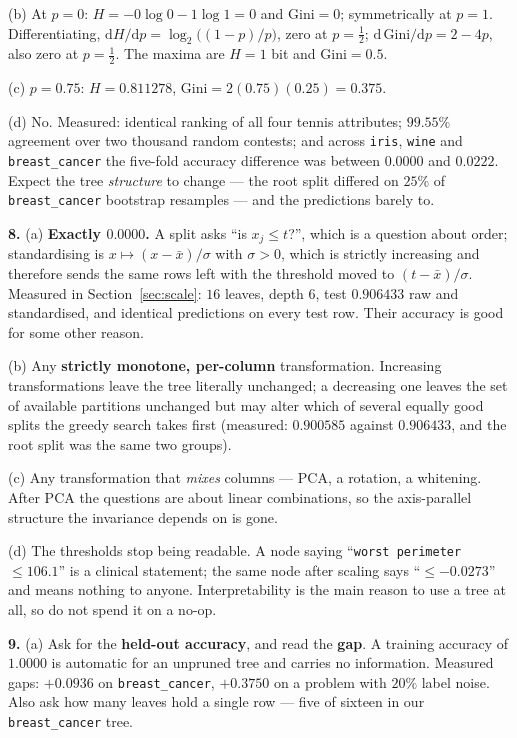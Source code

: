 \documentclass[11pt]{article}
\begin{document}
(b) At $p = 0$: $H = -0\log 0 - 1\log 1 = 0$ and $\mathrm{Gini} = 0$;
symmetrically at $p=1$. Differentiating,
$\mathrm{d}H/\mathrm{d}p = \log_2\!\big((1-p)/p\big)$, zero at $p = \tfrac12$;
$\mathrm{d}\,\mathrm{Gini}/\mathrm{d}p = 2 - 4p$, also zero at $p = \tfrac12$.
The maxima are $H = 1$ bit and $\mathrm{Gini} = 0.5$.

(c) $p = 0.75$: $H = 0.811278$, $\mathrm{Gini} = 2(0.75)(0.25) = 0.375$.

(d) No. Measured: identical ranking of all four tennis attributes; $99.55\%$
agreement over two thousand random contests; and across
\texttt{iris}, \texttt{wine} and \texttt{breast\_cancer} the five-fold
accuracy difference was between $0.0000$ and $0.0222$. Expect the tree
\emph{structure} to change --- the root split differed on $25\%$ of
\texttt{breast\_cancer} bootstrap resamples --- and the predictions barely to.

\medskip
\textbf{8.} (a) \textbf{Exactly $0.0000$.} A split asks ``is $x_j \le t$?'',
which is a question about order; standardising is
$x \mapsto (x - \bar x)/\sigma$ with $\sigma > 0$, which is strictly
increasing and therefore sends the same rows left with the threshold moved to
$(t - \bar x)/\sigma$. Measured in Section~\ref{sec:scale}: $16$ leaves, depth
$6$, test $0.906433$ raw and standardised, and identical predictions on every
test row. Their accuracy is good for some other reason.

(b) Any \textbf{strictly monotone, per-column} transformation. Increasing
transformations leave the tree literally unchanged; a decreasing one leaves
the set of available partitions unchanged but may alter which of several
equally good splits the greedy search takes first (measured: $0.900585$
against $0.906433$, and the root split was the same two groups).

(c) Any transformation that \emph{mixes} columns --- PCA, a rotation, a
whitening. After PCA the questions are about linear combinations, so the
axis-parallel structure the invariance depends on is gone.

(d) The thresholds stop being readable. A node saying ``\texttt{worst
perimeter} $\le 106.1$'' is a clinical statement; the same node after scaling
says ``$\le -0.0273$'' and means nothing to anyone. Interpretability is the
main reason to use a tree at all, so do not spend it on a no-op.

\medskip
\textbf{9.} (a) Ask for the \textbf{held-out accuracy}, and read the
\textbf{gap}. A training accuracy of $1.0000$ is automatic for an unpruned
tree and carries no information. Measured gaps: $+0.0936$ on
\texttt{breast\_cancer}, $+0.3750$ on a problem with $20\%$ label noise. Also
ask how many leaves hold a single row --- five of sixteen in our
\texttt{breast\_cancer} tree.
\end{document}
